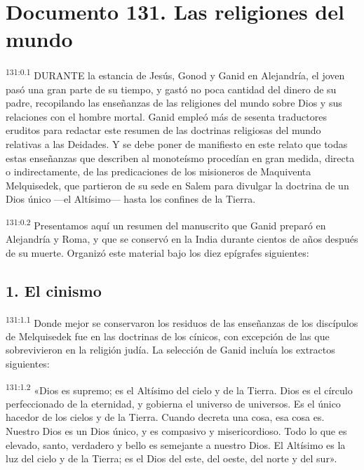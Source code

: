 \chapter{Documento 131. Las religiones del mundo}
\par
\textsuperscript{131:0.1} DURANTE la estancia de Jesús, Gonod y Ganid en Alejandría, el joven pasó una gran parte de su tiempo, y gastó no poca cantidad del dinero de su padre, recopilando las enseñanzas de las religiones del mundo sobre Dios y sus relaciones con el hombre mortal. Ganid empleó más de sesenta traductores eruditos para redactar este resumen de las doctrinas religiosas del mundo relativas a las Deidades. Y se debe poner de manifiesto en este relato que todas estas enseñanzas que describen al monoteísmo procedían en gran medida, directa o indirectamente, de las predicaciones de los misioneros de Maquiventa Melquisedek, que partieron de su sede en Salem para divulgar la doctrina de un Dios único ---el Altísimo--- hasta los confines de la Tierra.

\par
\textsuperscript{131:0.2} Presentamos aquí un resumen del manuscrito que Ganid preparó en Alejandría y Roma, y que se conservó en la India durante cientos de años después de su muerte. Organizó este material bajo los diez epígrafes siguientes:

\section*{1. El cinismo}
\par
\textsuperscript{131:1.1} Donde mejor se conservaron los residuos de las enseñanzas de los discípulos de Melquisedek fue en las doctrinas de los cínicos, con excepción de las que sobrevivieron en la religión judía. La selección de Ganid incluía los extractos siguientes:

\par
\textsuperscript{131:1.2} «Dios es supremo; es el Altísimo del cielo y de la Tierra. Dios es el círculo perfeccionado de la eternidad, y gobierna el universo de universos. Es el único hacedor de los cielos y de la Tierra. Cuando decreta una cosa, esa cosa es. Nuestro Dios es un Dios único, y es compasivo y misericordioso. Todo lo que es elevado, santo, verdadero y bello es semejante a nuestro Dios. El Altísimo es la luz del cielo y de la Tierra; es el Dios del este, del oeste, del norte y del sur».

